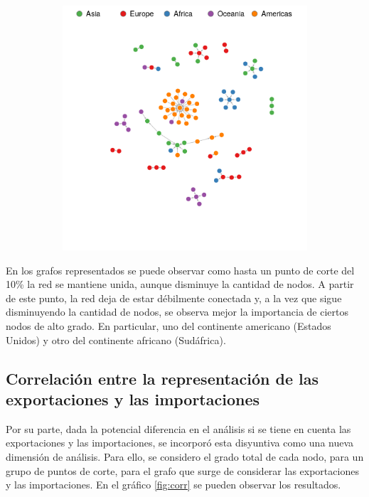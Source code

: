 \documentclass[runningheads,a4paper]{llncs}
\begin{document}
\begin{figure}
\begin{subfigure}{.3\linewidth}
\end{subfigure}%
\begin{subfigure}{.3\linewidth}
\label{fig:grafo_2011-b}%
\includegraphics[width=\linewidth]{grafo_2011_25_pcnt}%
\end{subfigure}
\caption[]{}%
\label{fig:grafo_2011}%
\end{figure}



En los grafos representados se puede observar como hasta un punto de corte del 10\% la red se mantiene unida, aunque disminuye la cantidad de nodos. A partir de este punto, la red deja de estar débilmente conectada y, a la vez que sigue disminuyendo la cantidad de nodos, se observa mejor la importancia de ciertos nodos de alto grado. En particular, uno del continente americano (Estados Unidos) y otro del continente africano (Sudáfrica).


\subsection{Correlación entre la representación de las exportaciones y las importaciones}

Por su parte, dada la potencial diferencia en el análisis si se tiene en cuenta las exportaciones y las importaciones, se incorporó esta disyuntiva como una nueva dimensión de análisis. Para ello, se considero el grado total de cada nodo, para un grupo de puntos de corte, para el grafo que surge de considerar las exportaciones y las importaciones. En el gráfico \ref{fig:corr} se pueden observar los resultados.
\end{document}
